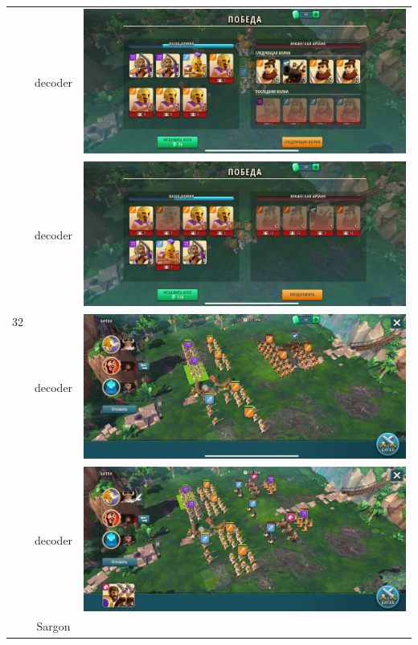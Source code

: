 \begin{longtable}{|c|c|c|}
    \hline
    \multirow{8}{*}{32} & decoder &
    \includegraphics[width=0.75\linewidth]{./parts/media/TreasureHunt/32/decoder/photo_2022-04-07_10-01-48.jpg} \\
    & decoder &
    \includegraphics[width=0.75\linewidth]{./parts/media/TreasureHunt/32/decoder/photo_2022-04-07_10-01-57.jpg} \\
    & decoder &
    \includegraphics[width=0.75\linewidth]{./parts/media/TreasureHunt/32/decoder/photo_2022-04-07_10-01-54.jpg} \\
    & decoder &
    \includegraphics[width=0.75\linewidth]{./parts/media/TreasureHunt/32/decoder/photo_2022-04-07_10-00-59.jpg} \\
    \hline
    \multirow{8}{*}{32} & Sargon &

\end{longtable}
